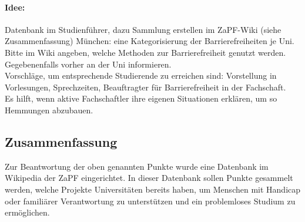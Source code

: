     \paragraph{Idee:}
      Datenbank im Studienführer, dazu Sammlung erstellen im ZaPF-Wiki (siehe Zusammenfassung)
      München: eine Kategorisierung der Barrierefreiheiten je Uni.
      Bitte im Wiki angeben, welche Methoden zur Barrierefreiheit genutzt werden.
      Gegebenenfalls vorher an der Uni informieren. \\

      Vorschläge, um entsprechende Studierende zu erreichen sind: Vorstellung in Vorlesungen, Sprechzeiten, Beauftragter für Barrierefreiheit in der Fachschaft. \\

      Es hilft, wenn aktive Fachschaftler ihre eigenen Situationen erklären, um so Hemmungen abzubauen.

    \subsection{Zusammenfassung}
      Zur Beantwortung der oben genannten Punkte wurde eine Datenbank im Wikipedia der ZaPF eingerichtet.
      In dieser Datenbank sollen Punkte gesammelt werden, welche Projekte Universitäten bereits haben, um Menschen mit Handicap oder familiärer Verantwortung zu unterstützen und ein problemloses Studium zu ermöglichen.
